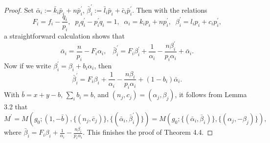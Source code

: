 \documentclass[10pt,a4paper]{amsart}
\begin{document}
\begin{proof}
Set $\bar{\alpha}_i:=\bar{k}_i\bar{p}_i+n\bar{p}_i^\prime$, 
$\bar{\beta}_i^\prime:=\bar{l}_i\bar{p}_i+\bar{c}_i\bar{p}_i^\prime$. Then with the relations
$$
F_i=f_i-\frac{q_i}{p_i},\;\; p_iq_i^\prime-p_i^\prime q_i=1, \;\; \alpha_i=k_ip_i+np_i^\prime, \;\;\beta_i^\prime=l_ip_i+c_ip_i^\prime, 
$$
a straightforward calculation shows that
$$
\bar{\alpha}_i=\frac{n}{p_i}-F_i\alpha_i, \;\;\;
\bar{\beta}_i^\prime=F_i\beta_i^\prime+\frac{1}{\alpha_i}
-\frac{n\beta_i^\prime}{p_i\alpha_i}+\bar{\alpha}_i.
$$
Now if we write $\beta_i^\prime=\beta_i+b_i\alpha_i$, then
$$
\bar{\beta}_i^\prime=F_i\beta_i+\frac{1}{\alpha_i}
-\frac{n\beta_i}{p_i\alpha_i}+ (1-b_i)\bar{\alpha}_i.
$$
With $\bar{b}=x+y-b$, $\sum_ib_i=b$, and $(n_j,c_j)=(\alpha_j,\beta_j)$, it follows from Lemma 3.2 that
$$
M^\prime=M(g_0; (1,-\bar{b}), \{(n_j,\bar{c}_j)\}, \{(\bar{\alpha}_i,\bar{\beta}_i^\prime)\})=
M(g_0; \{(\bar{\alpha}_i,\bar{\beta}_i)\}, \{(\alpha_j,-\beta_j)\}),
$$
where $\bar{\beta}_i=F_i\beta_i+\frac{1}{\alpha_i}-\frac{n\beta_i}{p_i\alpha_i}$. This finishes the proof of Theorem 4.4.

\end{proof}
\end{document}
